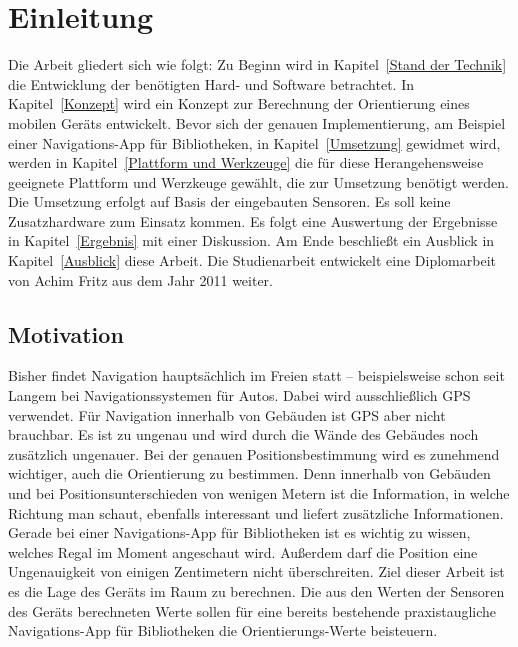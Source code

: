 
\chapter{Einleitung}\label{Einleitung}

\medskip
Die Arbeit gliedert sich wie folgt: Zu Beginn wird in Kapitel~\ref{Stand der Technik} die Entwicklung der benötigten Hard- und Software betrachtet. In Kapitel~\ref{Konzept} wird ein Konzept zur Berechnung der Orientierung eines mobilen Geräts entwickelt. Bevor sich der genauen Implementierung, am Beispiel einer Navigations-App für Bibliotheken, in Kapitel~\ref{Umsetzung} gewidmet wird, werden in Kapitel~\ref{Plattform und Werkzeuge} die für diese Herangehensweise geeignete Plattform und Werzkeuge gewählt, die zur Umsetzung benötigt werden. Die Umsetzung erfolgt auf Basis der eingebauten Sensoren. Es soll keine Zusatzhardware zum Einsatz kommen. Es folgt eine Auswertung der Ergebnisse in Kapitel~\ref{Ergebnis} mit einer Diskussion. Am Ende beschließt ein Ausblick in Kapitel~\ref{Ausblick} diese Arbeit. Die Studienarbeit entwickelt eine Diplomarbeit von Achim Fritz aus dem Jahr 2011 weiter.

\section{Motivation}\label{Motivation}
Bisher findet Navigation hauptsächlich im Freien statt – beispielsweise schon seit Langem bei Navigationssystemen für Autos. Dabei wird ausschließlich GPS verwendet. Für Navigation innerhalb von Gebäuden ist GPS aber nicht brauchbar. Es ist zu ungenau und wird durch die Wände des Gebäudes noch zusätzlich ungenauer. Bei der genauen Positionsbestimmung wird es zunehmend wichtiger, auch die Orientierung zu bestimmen. Denn innerhalb von Gebäuden und bei Positionsunterschieden von wenigen Metern ist die Information, in welche Richtung man schaut, ebenfalls interessant und liefert zusätzliche Informationen. Gerade bei einer Navigations-App für Bibliotheken ist es wichtig zu wissen, welches Regal im Moment angeschaut wird. Außerdem darf die Position eine Ungenauigkeit von einigen Zentimetern nicht überschreiten. Ziel dieser Arbeit ist es die Lage des Geräts im Raum zu berechnen. Die aus den Werten der Sensoren des Geräts berechneten Werte sollen für eine bereits bestehende praxistaugliche Navigations-App für Bibliotheken die Orientierungs-Werte beisteuern.